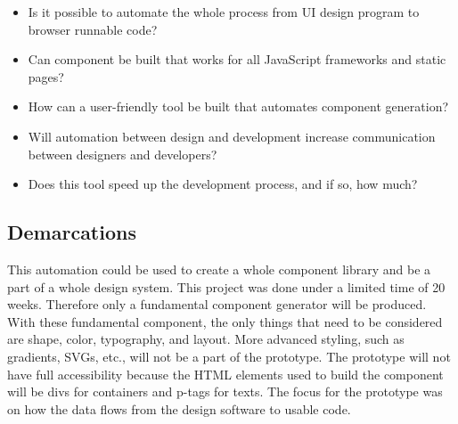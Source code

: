 \begin{itemize}
  \item Is it possible to automate the whole process from UI design program to browser runnable code? 
  \item Can \gls{component} be built that works for all JavaScript frameworks and static pages? 
  \item How can a user-friendly tool be built that automates component generation? 
  \item Will automation between design and development increase communication between designers and developers? 
  \item Does this tool speed up the development process, and if so, how much?
\end{itemize}

\subsection{Demarcations}%
\label{sub:Demarcations}
This automation could be used to create a whole component library and be a part of a whole design system. This project was done under a limited time of 20 weeks. Therefore only a fundamental component generator will be produced. With these fundamental \gls{component}, the only things that need to be considered are shape, color, typography, and layout. More advanced styling, such as gradients, SVGs, etc., will not be a part of the prototype. The prototype will not have full accessibility because the HTML elements used to build the \gls{component} will be divs for containers and p-tags for texts. The focus for the prototype was on how the data flows from the design software to usable code.




